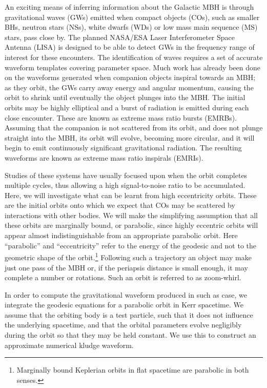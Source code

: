 \documentclass[a4paper, 11pt, titlepage, twoside]{report}
\begin{document}
{An exciting means of inferring information about the Galactic MBH is through gravitational waves (GWs) emitted when compact objects (COs), such as smaller BHs, neutron stars (NSs), white dwarfs (WDs) or low mass main sequence (MS) stars, pass close by. The planned NASA/ESA Laser Interferometer Space Antenna (LISA) is designed to be able to detect GWs in the frequency range of interest for these encounters\cite{Bender1998, Danzmann2003}. The identification of waves requires a set of accurate waveform templates covering parameter space. Much work has already been done on the waveforms generated when companion objects inspiral towards an MBH; as they orbit, the GWs carry away energy and angular momentum, causing the orbit to shrink until eventually the object plunges into the MBH. The initial orbits may be highly elliptical and a burst of radiation is emitted during each close encounter. These are known as extreme mass ratio bursts (EMRBs)\cite{Rubbo2006}. Assuming that the companion is not scattered from its orbit, and does not plunge straight into the MBH, its orbit will evolve, becoming more circular, and it will begin to emit continuously significant gravitational radiation. The resulting waveforms are known as extreme mass ratio inspirals (EMRIs).

Studies of these systems have usually focused upon when the orbit completes multiple cycles, thus allowing a high signal-to-noise ratio to be accumulated. Here, we will investigate what can be learnt from high eccentricity orbits. These are the initial orbits onto which we expect that COs may be scattered by interactions with other bodies. We will make the simplifying assumption that all these orbits are marginally bound, or parabolic, since highly eccentric orbits will appear almost indistinguishable from an appropriate parabolic orbit\cite{Kobayashi2004}. Here ``parabolic'' and ``eccentricity'' refer to the energy of the geodesic and not to the geometric shape of the orbit.\footnote{Marginally bound Keplerian orbits in flat spacetime are parabolic in both senses.} Following such a trajectory an object may make just one pass of the MBH or, if the periapsis distance is small enough, it may complete a number or rotations. Such an orbit is referred to as zoom-whirl.

In order to compute the gravitational waveform produced in such as case, we integrate the geodesic equations for a parabolic orbit in Kerr spacetime. We assume that the orbiting body is a test particle, such that it does not influence the underlying spacetime, and that the orbital parameters evolve negligibly during the orbit so that they may be held constant. We use this to construct an approximate numerical kludge waveform\cite{Babak2007}.

}
\end{document}
